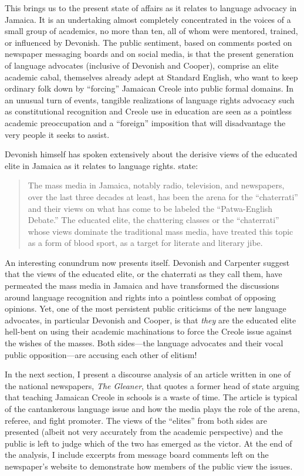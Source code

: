 \documentclass[output=paper,colorlinks,citecolor=brown]{langscibook}
\begin{document}
This brings us to the present state of affairs as it relates to language advocacy in Jamaica. It is an undertaking almost completely concentrated in the voices of a small group of academics, no more than ten, all of whom were mentored, trained, or influenced by Devonish. The public sentiment, based on comments posted on newspaper messaging boards and on social media, is that the present generation of language advocates (inclusive of Devonish and Cooper), comprise an elite academic cabal, themselves already adept at Standard English, who want to keep ordinary folk down by “forcing” Jamaican Creole into public formal domains. In an unusual turn of events, tangible realizations of language rights advocacy such as constitutional recognition and Creole use in education are seen as a pointless academic preoccupation and a “foreign” imposition that will disadvantage the very people it seeks to assist. 

Devonish himself has spoken extensively about the derisive views of the educated elite in Jamaica as it relates to language rights. \citet[55]{DevonishCarpenter2020} state:

\begin{quote}
    The mass media in Jamaica, notably radio, television, and newspapers, over the last three decades at least, has been the arena for the “chaterrati” and their views on what has come to be labeled the “Patwa-English Debate.” The educated elite, the chattering classes or the “chaterrati” whose views dominate the traditional mass media, have treated this topic as a form of blood sport, as a target for literate and literary jibe.
\end{quote}

An interesting conundrum now presents itself. Devonish and Carpenter suggest that the views of the educated elite, or the chaterrati as they call them, have permeated the mass media in Jamaica and have transformed the discussions around language recognition and rights into a pointless combat of opposing opinions. Yet, one of the most persistent public criticisms of the new language advocates, in particular Devonish and Cooper, is that \emph{they} are the educated elite hell-bent on using their academic machinations to force the Creole issue against the wishes of the masses. Both sides—the language advocates and their vocal public opposition—are accusing each other of elitism! 

In the next section, I present a discourse analysis of an article written in one of the national newspapers, \textit{The Gleaner}, that quotes a former head of state arguing that teaching Jamaican Creole in schools is a waste of time. The article is typical of the cantankerous language issue and how the media plays the role of the arena, referee, and fight promoter. The views of the “elites” from both sides are presented (albeit not very accurately from the academic perspective) and the public is left to judge which of the two has emerged as the victor. At the end of the analysis, I include excerpts from message board comments left on the newspaper’s website to demonstrate how members of the public view the issues. 
\end{document}
